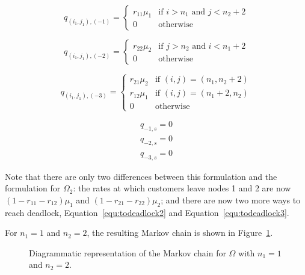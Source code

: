 \documentclass{article}
\numberwithin{equation}{section}
\begin{document}
\begin{equation}\label{equ:todeadlock2}
  q_{(i_1, j_1), (-1)} = \left\{
  \begin{array}{rr}
    r_{11}\mu_1 & \text{if } i > n_1 \text{ and } j < n_2 + 2 \\
    0 & \text{otherwise}
  \end{array}
  \right.
\end{equation}

\begin{equation}\label{equ:todeadlock3}
  q_{(i_1, j_1), (-2)} = \left\{
  \begin{array}{rr}
    r_{22}\mu_2 & \text{if } j > n_2 \text{ and } i < n_1 + 2 \\
    0 & \text{otherwise}
  \end{array}
  \right.
\end{equation}

\begin{equation}\label{eqn:2nssfB}
  q_{(i_1, j_1), (-3)} = \left\{
  \begin{array}{rr}
    r_{21}\mu_2 & \text{if } (i, j) = (n_1, n_2 + 2) \\
    r_{12}\mu_1 & \text{if } (i, j) = (n_1 + 2, n_2) \\
    0 & \text{otherwise}
  \end{array}
  \right.
\end{equation}

\begin{align}
  q_{-1, s} = 0 \\
  q_{-2, s} = 0 \\
  q_{-3, s} = 0
\end{align}

Note that there are only two differences between this formulation and the formulation for $\Omega_2$: the rates at which customers leave nodes 1 and 2 are now $(1-r_{11}-r_{12})\mu_1$ and $(1-r_{21}-r_{22})\mu_2$; and there are now two more ways to reach deadlock, Equation~\ref{equ:todeadlock2} and Equation~\ref{equ:todeadlock3}.

For $n_1 = 1$ and $n_2 = 2$, the resulting Markov chain is shown in Figure~\ref{fig:2nodeMCfeedback}.

\begin{figure}[!htbp]
    \begin{center}
    
    \end{center}
    \caption{Diagrammatic representation of the Markov chain for $\Omega$ with $n_1=1$ and $n_2=2$.}
    \label{fig:2nodeMCfeedback}
\end{figure}
\end{document}
